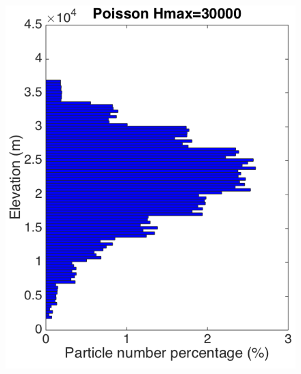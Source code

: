 \begin{figure}[!htb]
\begin{minipage}{.247 \textwidth}
        \includegraphics[width=0.99 \textwidth]{Chapter-7/Figures/Possion-Hmax30k-ParticleDis-z}
    \end{minipage}%
    \begin{minipage}{.247 \textwidth}
        \centering

\end{minipage}
\end{figure}
